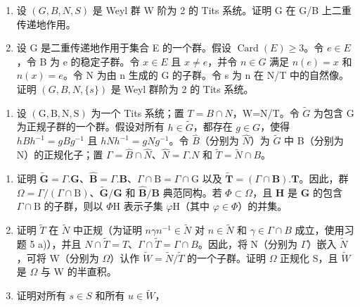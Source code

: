 \begin{enumerate}
\def\labelenumi{\alph{enumi})}
\item
  设 \((G, B, N, S)\) 是 Weyl 群 W 阶为 2 的 Tits 系统。证明 G 在 G/B 上二重传递地作用。
\item
  设 G 是二重传递地作用于集合 E 的一个群。假设 \(\operatorname{Card}(E) \geqslant 3\)。令 \(e \in E\)，令 B 为 e 的稳定子群。令 \(x \in E\) 且 \(x \neq e\)，并令 \(n \in G\) 满足 \(n(e) = x\) 和 \(n(x) = e\)。令 N 为由 n 生成的 G 的子群。令 s 为 n 在 N/T 中的自然像。证明 \((G, B, N, \{s\})\) 是 Weyl 群阶为 2 的 Tits 系统。
\end{enumerate}

\begin{enumerate}
\def\labelenumi{\arabic{enumi})}
\setcounter{enumi}{7}
\tightlist
\item
  设 \((\mathrm{G},\mathrm{B},\mathrm{N},\mathrm{S})\) 为一个 Tits 系统；置 \(T=B\cap N\)，W=N/T。令 \(\tilde{G}\) 为包含 G 为正规子群的一个群。假设对所有 \(h\in\tilde{G}\)，都存在 \(g\in G\)，使得 \(hBh^{-1}=gBg^{-1}\) 且 \(hNh^{-1}=gNg^{-1}\)。令 \(\hat{B}\)（分别为 \(\hat{N}\)）为 \(\tilde{G}\) 中 B（分别为 N）的正规化子；置 \(\Gamma=\hat{B}\cap\hat{N}\)、\(\hat{N}=\Gamma.N\) 和 \(\tilde{T}=\tilde{N}\cap B\)。
\end{enumerate}

\begin{enumerate}
\def\labelenumi{\alph{enumi})}
\item
  证明 \(\tilde{\mathbf{G}} = \Gamma .\mathbf{G}\)、\(\hat{\mathbf{B}} = \Gamma .\mathbf{B}\)、\(\Gamma \cap \mathrm{B} = \Gamma \cap \mathrm{G}\) 以及 \(\tilde{\mathbf{T}} = (\Gamma \cap \mathbf{B}).\mathbf{T}\)。因此，群 \(\Omega = \Gamma /(\Gamma \cap \mathrm{B})\)、\(\tilde{\mathbf{G}} /\mathbf{G}\) 和 \(\hat{\mathbf{B}} /\mathbf{B}\) 典范同构。若 \(\varPhi \subset \varOmega\)，且 \(\mathbf{H}\) 是 \(\mathbf{G}\) 的包含 \(\Gamma \cap \mathrm{B}\) 的子群，则以 \(\varPhi \mathrm{H}\) 表示子集 \(\varphi \mathrm{H}\)（其中 \(\varphi \in \varPhi\)）的并集。
\item
  证明 \(\tilde{T}\) 在 \(\tilde{N}\) 中正规（为证明 \(n\gamma n^{-1} \in \tilde{N}\) 对 \(n \in \tilde{N}\) 和 \(\gamma \in \Gamma \cap B\) 成立，使用习题 5 a)），并且 \(N \cap \tilde{T} = T\)、\(\Gamma \cap \tilde{T} = \Gamma \cap B\)。因此，将 N（分别为 \(\Gamma\)）嵌入 \(\tilde{N}\)，可将 W（分别为 \(\Omega\)）认作 \(\tilde{W} = \tilde{N}/\tilde{T}\) 的一个子群。证明 \(\Omega\) 正规化 S，且 \(\tilde{W}\) 是 \(\Omega\) 与 W 的半直积。
\item
  证明对所有 \(s \in S\) 和所有 \(u \in \tilde{W}\)，
\end{enumerate}

